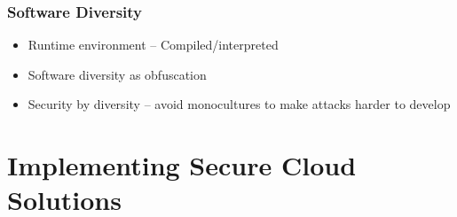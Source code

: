 		\subsubsection {Software Diversity}
			\begin{itemize}
				\item Runtime environment -- Compiled/interpreted
				\item Software diversity as obfuscation
				\item Security by diversity -- avoid monocultures to make
					attacks harder to develop
			\end{itemize}

\section {Implementing Secure Cloud Solutions}
